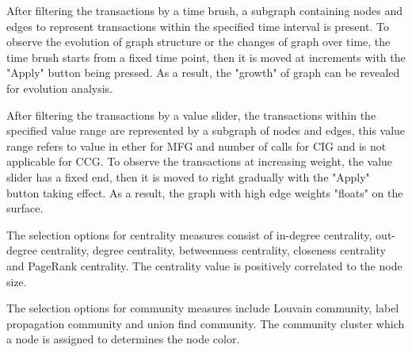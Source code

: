 After filtering the transactions by a time brush, a subgraph containing nodes and edges to represent transactions within the specified time interval is present. To observe the evolution of graph structure or the changes of graph over time, the time brush starts from a fixed time point, then it is moved at increments with the "Apply" button being pressed. As a result, the "growth" of graph can be revealed for evolution analysis.

After filtering the transactions by a value slider, the transactions within the specified value range are represented by a subgraph of nodes and edges, this value range refers to value in ether for MFG and number of calls for CIG and is not applicable for CCG. To observe the transactions at increasing weight, the value slider has a fixed end, then it is moved to right gradually with the "Apply" button taking effect. As a result, the graph with high edge weights "floats" on the surface.

The selection options for centrality measures consist of in-degree centrality, out-degree centrality, degree centrality, betweenness centrality, closeness centrality and PageRank centrality. The centrality value is positively correlated to the node size.

The selection options for community measures include Louvain community, label propagation community and union find community. The community cluster which a node is assigned to determines the node color.


